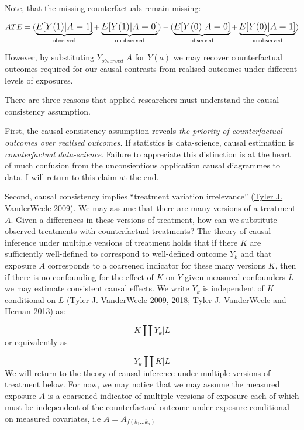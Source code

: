 \documentclass[
  singlecolumn]{report}
\begin{document}
Note, that the missing counterfactuals remain missing:

\[
ATE = \large(\underbrace{E[Y(1)|A = 1]}_\text{observed} + \underbrace{E[Y(1)|A = 0]}_\text{unobserved}\large) - \large(\underbrace{E[Y(0)|A = 0]}_\text{observed}  + \underbrace{E[Y(0)|A = 1]}_\text{unobserved}\large)
\]

However, by substituting \(Y_{observed}|A\) for \(Y(a)\) we may recover
counterfactual outcomes required for our causal contrasts from realised
outcomes under different levels of exposures.

There are three reasons that applied researchers must understand the
causal consistency assumption.

First, the causal consistency assumption reveals \emph{the priority of
counterfactual outcomes over realised outcomes.} If statistics is
data-science, causal estimation is \emph{counterfactual data-science}.
Failure to appreciate this distinction is at the heart of much confusion
from the unconsientious application causal diagrammes to data. I will
return to this claim at the end.

Second, causal consistency implies ``treatment variation irrelevance''
(\protect\hyperlink{ref-vanderweele2009}{Tyler J. VanderWeele 2009}). We
may assume that there are many versions of a treatment \(A\). Given a
differences in these versions of treatment, how can we substitute
observed treatments with counterfactual treatments? The theory of causal
inference under multiple versions of treatment holds that if there \(K\)
are sufficiently well-defined to correspond to well-defined outcome
\(Y_k\) and that exposure \(A\) corresponds to a coarsened indicator for
these many versions \(K\), then if there is no confounding for the
effect of \(K\) on \(Y\) given measured confounders \(L\) we may
estimate consistent causal effects. We write \(Y_k\) is independent of
\(K\) conditional on \(L\)
(\protect\hyperlink{ref-vanderweele2009}{Tyler J. VanderWeele 2009},
\protect\hyperlink{ref-vanderweele2018}{2018};
\protect\hyperlink{ref-vanderweele2013}{Tyler J. VanderWeele and Hernan
2013}) as:

\[K \coprod Y_k | L\] or equivalently as

\[Y_k \coprod K | L\] We will return to the theory of causal inference
under multiple versions of treatment below. For now, we may notice that
we may assume the measured exposure \(A\) is a coarsened indicator of
multiple versions of exposure each of which must be independent of the
counterfactual outcome under exposure conditional on measured
covariates, i.e \(A = A_{f(k_1\dots k_n)}\)
\end{document}
